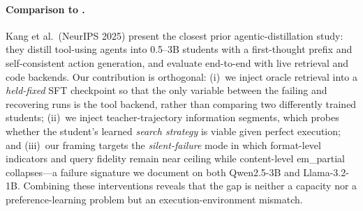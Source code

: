 \paragraph{Comparison to \citet{kang2025agent}.}
Kang et al.\ (NeurIPS 2025) present the closest prior agentic-distillation study: they distill tool-using agents into 0.5--3B students with a first-thought prefix and self-consistent action generation, and evaluate end-to-end with live retrieval and code backends. Our contribution is orthogonal: (i)~we inject oracle retrieval into a \emph{held-fixed} SFT checkpoint so that the only variable between the failing and recovering runs is the tool backend, rather than comparing two differently trained students; (ii)~we inject teacher-trajectory information segments, which probes whether the student's learned \emph{search strategy} is viable given perfect execution; and (iii)~our framing targets the \emph{silent-failure} mode in which format-level indicators and query fidelity remain near ceiling while content-level em\_partial collapses---a failure signature we document on both Qwen2.5-3B and Llama-3.2-1B. Combining these interventions reveals that the gap is neither a capacity nor a preference-learning problem but an execution-environment mismatch.
